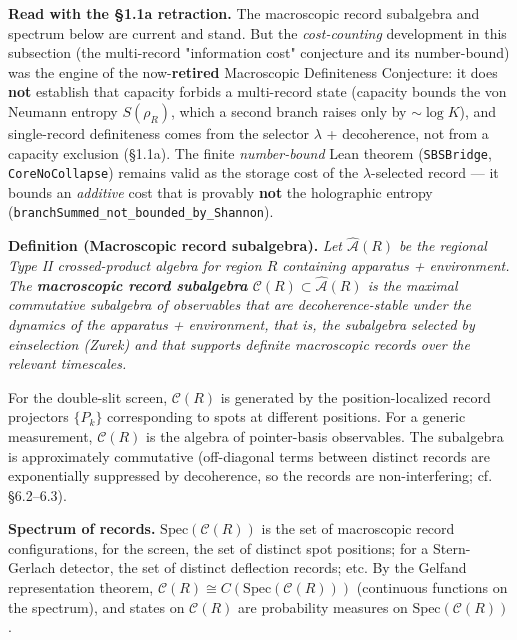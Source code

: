 \documentclass[11pt,a4paper]{article}
\newenvironment{qiqtquote}{\begin{mdframed}[style=quotestyle]}{\end{mdframed}}
\begin{document}
\begin{qiqtquote}
\textbf{Read with the §1.1a retraction.} The macroscopic record subalgebra and spectrum below are current and stand. But the \emph{cost-counting} development in this subsection (the multi-record "information cost" conjecture and its number-bound) was the engine of the now-\textbf{retired} Macroscopic Definiteness Conjecture: it does \textbf{not} establish that capacity forbids a multi-record state (capacity bounds the von Neumann entropy $S(\rho_R)$, which a second branch raises only by $\sim\!\log K$), and single-record definiteness comes from the selector $\lambda$ + decoherence, not from a capacity exclusion (§1.1a). The finite \emph{number-bound} Lean theorem (\texttt{SBSBridge}, \texttt{CoreNoCollapse}) remains valid as the storage cost of the $\lambda$-selected record — it bounds an \emph{additive} cost that is provably \textbf{not} the holographic entropy (\texttt{branchSummed\_not\_bounded\_by\_Shannon}).
\end{qiqtquote}

\textbf{Definition (Macroscopic record subalgebra).} \emph{Let $\hat{\mathcal{A}}(R)$ be the regional Type II crossed-product algebra for region $R$ containing apparatus + environment. The \textbf{macroscopic record subalgebra} $\mathcal{C}(R) \subset \hat{\mathcal{A}}(R)$ is the maximal commutative subalgebra of observables that are decoherence-stable under the dynamics of the apparatus + environment, that is, the subalgebra selected by einselection (Zurek) and that supports definite macroscopic records over the relevant timescales.}

For the double-slit screen, $\mathcal{C}(R)$ is generated by the position-localized record projectors $\{P_k\}$ corresponding to spots at different positions. For a generic measurement, $\mathcal{C}(R)$ is the algebra of pointer-basis observables. The subalgebra is approximately commutative (off-diagonal terms between distinct records are exponentially suppressed by decoherence, so the records are non-interfering; cf. §6.2–6.3).

\textbf{Spectrum of records.} $\mathrm{Spec}(\mathcal{C}(R))$ is the set of macroscopic record configurations, for the screen, the set of distinct spot positions; for a Stern-Gerlach detector, the set of distinct deflection records; etc. By the Gelfand representation theorem, $\mathcal{C}(R) \cong C(\mathrm{Spec}(\mathcal{C}(R)))$ (continuous functions on the spectrum), and states on $\mathcal{C}(R)$ are probability measures on $\mathrm{Spec}(\mathcal{C}(R))$.
\end{document}
